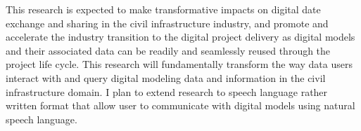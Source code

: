 \documentclass[a4paper,11pt]{article}
\begin{document}
%
%
%
This research is expected to make transformative impacts on digital date exchange and sharing in the civil infrastructure industry, and promote and accelerate the industry transition to the digital project delivery as digital models and their associated data can be readily and seamlessly reused through the project life cycle.
%
This research will fundamentally transform the way data users interact with and query digital modeling data and information in the civil infrastructure domain.
%
I plan to extend research to speech language rather written format that allow user to communicate with digital models using natural speech language.
%
%
\end{document}
